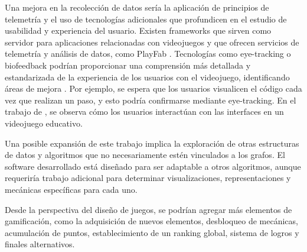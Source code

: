Una mejora en la recolección de datos sería la aplicación de principios de telemetría y el uso de tecnologías adicionales que profundicen en el estudio de usabilidad y experiencia del usuario. Existen frameworks que sirven como servidor para aplicaciones relacionadas con videojuegos y que ofrecen servicios de telemetría y análisis de datos, como PlayFab \cite{PlayFabTelemetry}. Tecnologías como eye-tracking o biofeedback podrían proporcionar una comprensión más detallada y estandarizada de la experiencia de los usuarios con el videojuego, identificando áreas de mejora \cite{Zain2011EyeTI}. Por ejemplo, se espera que los usuarios visualicen el código cada vez que realizan un paso, y esto podría confirmarse mediante eye-tracking. En el trabajo de \cite{Zain2011EyeTI}, se observa cómo los usuarios interactúan con las interfaces en un videojuego educativo.

Una posible expansión de este trabajo implica la exploración de otras estructuras de datos y algoritmos que no necesariamente estén vinculados a los grafos. El software desarrollado está diseñado para ser adaptable a otros algoritmos, aunque requeriría trabajo adicional para determinar visualizaciones, representaciones y mecánicas específicas para cada uno.

Desde la perspectiva del diseño de juegos, se podrían agregar más elementos de gamificación, como la adquisición de nuevos elementos, desbloqueo de mecánicas, acumulación de puntos, establecimiento de un ranking global, sistema de logros y finales alternativos.
